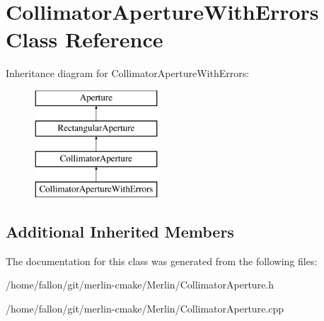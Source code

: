 \hypertarget{classCollimatorApertureWithErrors}{}\section{Collimator\+Aperture\+With\+Errors Class Reference}
\label{classCollimatorApertureWithErrors}
Inheritance diagram for Collimator\+Aperture\+With\+Errors\+:\begin{figure}[H]
\begin{center}
\leavevmode
\includegraphics[height=4.000000cm]{classCollimatorApertureWithErrors}
\end{center}
\end{figure}
\subsection*{Additional Inherited Members}


The documentation for this class was generated from the following files\+:\begin{DoxyCompactItemize}
\item 
/home/fallon/git/merlin-\/cmake/\+Merlin/Collimator\+Aperture.\+h\item 
/home/fallon/git/merlin-\/cmake/\+Merlin/Collimator\+Aperture.\+cpp\end{DoxyCompactItemize}
